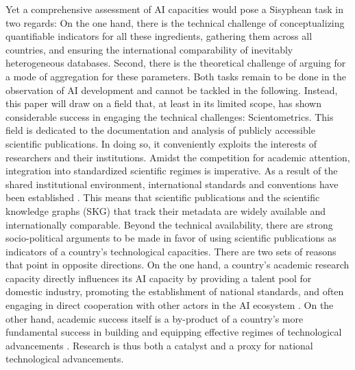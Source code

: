 \documentclass{article}
\begin{document}
	Yet a comprehensive assessment of AI capacities would pose a Sisyphean task in two regards: On the one hand, there is the technical challenge of conceptualizing quantifiable indicators for all these ingredients, gathering them across all countries, and ensuring the international comparability of inevitably heterogeneous databases. Second, there is the theoretical challenge of arguing for a mode of aggregation for these parameters. Both tasks remain to be done in the observation of AI development and cannot be tackled in the following. Instead, this paper will draw on a field that, at least in its limited scope, has shown considerable success in engaging the technical challenges: Scientometrics. This field is dedicated to the documentation and analysis of publicly accessible scientific publications. In doing so, it conveniently exploits the interests of researchers and their institutions. Amidst the competition for academic attention, integration into standardized scientific regimes is imperative. As a result of the shared institutional environment, international standards and conventions have been established \cite{machacek2021globalization}. This means that scientific publications and the scientific knowledge graphs (SKG) that track their metadata are widely available and internationally comparable. Beyond the technical availability, there are strong socio-political arguments to be made in favor of using scientific publications as indicators of a country's technological capacities. There are two sets of reasons that point in opposite directions. On the one hand, a country's academic research capacity directly influences its AI capacity by providing a talent pool for domestic industry, promoting the establishment of national standards, and often engaging in direct cooperation with other actors in the AI ecosystem \cite{brekke2021university}. On the other hand, academic success itself is a by-product of a country's more fundamental success in building and equipping effective regimes of technological advancements \cite{szczygielski2024mutual}. Research is thus both a catalyst and a proxy for national technological advancements.
	
\end{document}

